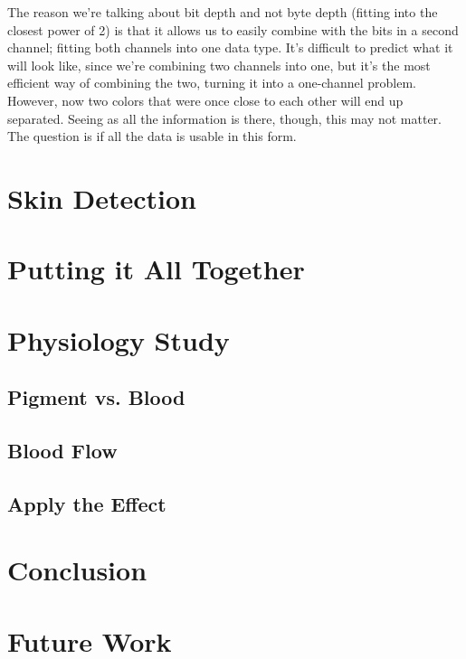 \documentclass[10pt,a4paper]{article}
\begin{document}
The reason we're talking about bit depth and not byte depth (fitting into the closest power of 2) is that it allows us to easily combine with the bits in a second channel; fitting both channels into one data type. It's difficult to predict what it will look like, since we're combining two channels into one, but it's the most efficient way of combining the two, turning it into a one-channel problem. However, now two colors that were once close to each other will end up separated. Seeing as all the information is there, though, this may not matter. The question is if all the data is usable in this form.



\section{Skin Detection}\label{sec:SkinDetection}

\section{Putting it All Together}\label{sec:PuttingItAllTogether}

\section{Physiology Study}\label{sec:PhysiologyStudy}

\subsection{Pigment vs. Blood}\label{sec:PigmentVs.Blood}

\subsection{Blood Flow}\label{sec:BloodFlow}

\subsection{Apply the Effect}\label{sec:ApplyTheEffect}

\section{Conclusion}



\section{Future Work}




\end{document}
